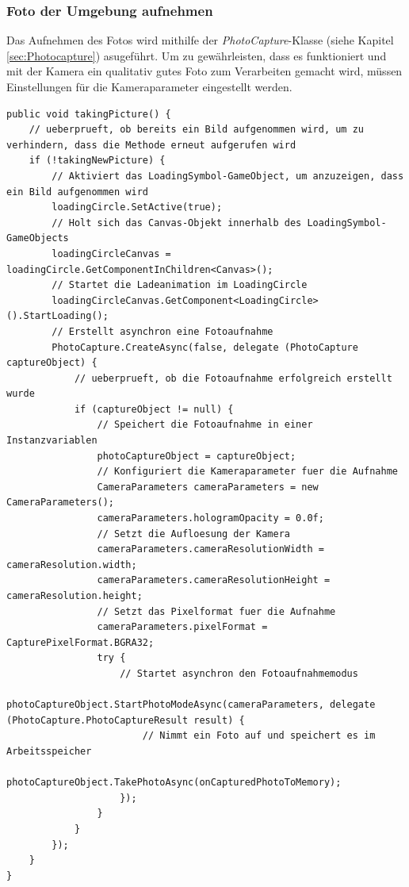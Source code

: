\subsubsection{Foto der Umgebung aufnehmen}
Das Aufnehmen des Fotos wird mithilfe der \textit{PhotoCapture}-Klasse (siehe Kapitel \ref{sec:Photocapture}) asugeführt. Um zu gewährleisten, dass es funktioniert und mit der Kamera ein qualitativ gutes Foto zum Verarbeiten gemacht wird, müssen Einstellungen für die Kameraparameter eingestellt werden.
\begin{lstlisting}[style=csharp, caption={Bild einstellung und aufnahme}, label=code:takingPicture]
public void takingPicture() {
    // ueberprueft, ob bereits ein Bild aufgenommen wird, um zu verhindern, dass die Methode erneut aufgerufen wird
    if (!takingNewPicture) {
        // Aktiviert das LoadingSymbol-GameObject, um anzuzeigen, dass ein Bild aufgenommen wird
        loadingCircle.SetActive(true);
        // Holt sich das Canvas-Objekt innerhalb des LoadingSymbol-GameObjects
        loadingCircleCanvas = loadingCircle.GetComponentInChildren<Canvas>();
        // Startet die Ladeanimation im LoadingCircle
        loadingCircleCanvas.GetComponent<LoadingCircle>().StartLoading();
        // Erstellt asynchron eine Fotoaufnahme
        PhotoCapture.CreateAsync(false, delegate (PhotoCapture captureObject) {
            // ueberprueft, ob die Fotoaufnahme erfolgreich erstellt wurde
            if (captureObject != null) {
                // Speichert die Fotoaufnahme in einer Instanzvariablen
                photoCaptureObject = captureObject;
                // Konfiguriert die Kameraparameter fuer die Aufnahme
                CameraParameters cameraParameters = new CameraParameters();
                cameraParameters.hologramOpacity = 0.0f;
                // Setzt die Aufloesung der Kamera
                cameraParameters.cameraResolutionWidth = cameraResolution.width;
                cameraParameters.cameraResolutionHeight = cameraResolution.height;
                // Setzt das Pixelformat fuer die Aufnahme
                cameraParameters.pixelFormat = CapturePixelFormat.BGRA32;
                try {
                    // Startet asynchron den Fotoaufnahmemodus
                    photoCaptureObject.StartPhotoModeAsync(cameraParameters, delegate (PhotoCapture.PhotoCaptureResult result) {
                        // Nimmt ein Foto auf und speichert es im Arbeitsspeicher
                        photoCaptureObject.TakePhotoAsync(onCapturedPhotoToMemory);
                    });
                }
            }
        });
    }
}
\end{lstlisting}
